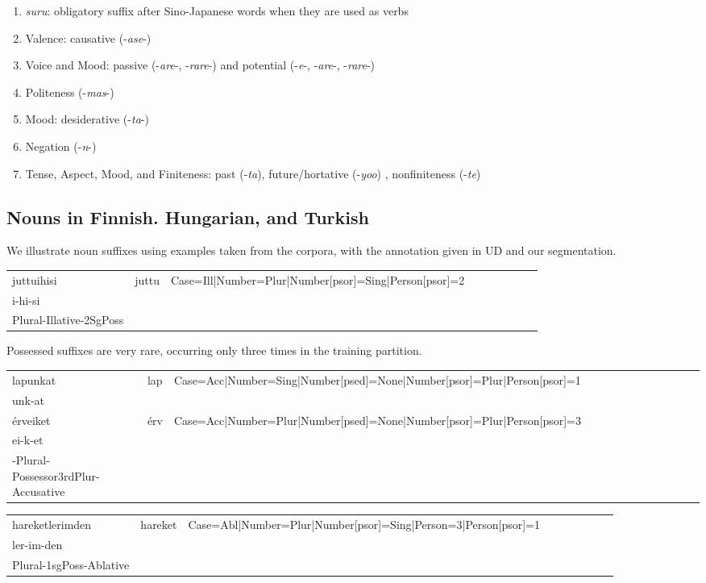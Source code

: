 \documentclass[11pt,letterpaper]{article}
\begin{document}
\begin{enumerate}
\item \textit{suru}: obligatory suffix after Sino-Japanese words when they are used as verbs
\item Valence: causative (-\textit{ase}-)
\item Voice and Mood: passive (-\textit{are}-, -\textit{rare}-) and potential (-\textit{e}-, -\textit{are}-, -\textit{rare}-)
\item Politeness (-\textit{mas}-)
\item Mood: desiderative (-\textit{ta}-)
\item Negation (-\textit{n}-)
\item Tense, Aspect, Mood, and Finiteness: past (-\textit{ta}), future/hortative (-\textit{yoo}) \citep[229]{kaiser2013japanese}, nonfiniteness (-\textit{te})
\end{enumerate}


\subsection{Nouns in Finnish. Hungarian, and Turkish}

We illustrate noun suffixes using examples taken from the corpora, with the annotation given in UD and our segmentation.


\begin{tabular}{lllllllll}
juttuihisi& 	juttu	&	Case=Ill|Number=Plur|Number[psor]=Sing|Person[psor]=2 \\
i-hi-si \\
Plural-Illative-2SgPoss \\
\end{tabular}



Possessed suffixes are very rare, occurring only three times in the training partition. 

\begin{tabular}{lllllllllllll}
lapunkat &	lap &	Case=Acc|Number=Sing|Number[psed]=None|Number[psor]=Plur|Person[psor]=1	\\
unk-at \\
érveiket	& érv &	Case=Acc|Number=Plur|Number[psed]=None|Number[psor]=Plur|Person[psor]=3 \\
ei-k-et \\
-Plural-Possessor3rdPlur-Accusative \\
\end{tabular}


\begin{tabular}{lllllllll}
hareketlerimden	& hareket	& 	Case=Abl|Number=Plur|Number[psor]=Sing|Person=3|Person[psor]=1	\\
ler-im-den \\
Plural-1sgPoss-Ablative
\end{tabular}
\end{document}
